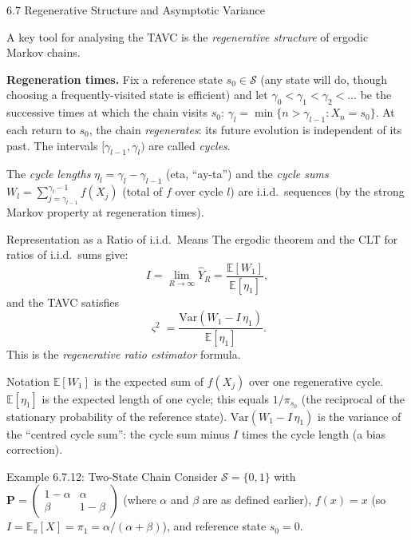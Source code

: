 \documentclass[aspectratio=169,10pt]{beamer}
\newcommand{\EE}{\mathbb{E}}
\newcommand{\bfP}{\mathbf{P}}
\begin{document}
\begin{frame}[allowframebreaks]{6.7 Regenerative Structure and Asymptotic Variance}

A key tool for analysing the TAVC is the \emph{regenerative structure} of ergodic Markov chains.

\textbf{Regeneration times.}
Fix a reference state $s_0 \in \mathcal{S}$ (any state will do, though choosing a frequently-visited state is efficient) and let $\gamma_0 < \gamma_1 < \gamma_2 < \ldots$ be the successive times at which the chain visits $s_0$: $\gamma_l = \min\{n > \gamma_{l-1} : X_n = s_0\}$.
At each return to $s_0$, the chain \emph{regenerates}: its future evolution is independent of its past.
The intervals $[\gamma_{l-1}, \gamma_l)$ are called \emph{cycles}.

The \emph{cycle lengths} $\eta_l = \gamma_l - \gamma_{l-1}$ (eta, ``ay-ta'') and the \emph{cycle sums} $W_l = \sum_{j=\gamma_{l-1}}^{\gamma_l - 1} f(X_j)$ (total of $f$ over cycle $l$) are i.i.d.\ sequences (by the strong Markov property at regeneration times).

\begin{block}{Representation as a Ratio of i.i.d.\ Means}
The ergodic theorem and the CLT for ratios of i.i.d.\ sums give:
\[
  I = \lim_{R \to \infty} \hat{Y}_R = \frac{\EE[W_1]}{\EE[\eta_1]},
\]
and the TAVC satisfies
\[
  \varsigma^2 = \frac{\mathrm{Var}(W_1 - I\,\eta_1)}{\EE[\eta_1]}.
\]
This is the \emph{regenerative ratio estimator} formula.
\end{block}

\begin{block}{Notation}
$\EE[W_1]$ is the expected sum of $f(X_j)$ over one regenerative cycle.
$\EE[\eta_1]$ is the expected length of one cycle; this equals $1/\pi_{s_0}$ (the reciprocal of the stationary probability of the reference state).
$\mathrm{Var}(W_1 - I\,\eta_1)$ is the variance of the ``centred cycle sum'': the cycle sum minus $I$ times the cycle length (a bias correction).
\end{block}

\framebreak

\begin{block}{Example 6.7.12: Two-State Chain}
Consider $\mathcal{S} = \{0,1\}$ with $\bfP = \begin{pmatrix}1-\alpha & \alpha \\ \beta & 1-\beta\end{pmatrix}$ (where $\alpha$ and $\beta$ are as defined earlier), $f(x) = x$ (so $I = \EE_\pi[X] = \pi_1 = \alpha/(\alpha+\beta)$), and reference state $s_0 = 0$.


\end{block}
\end{frame}
\end{document}

